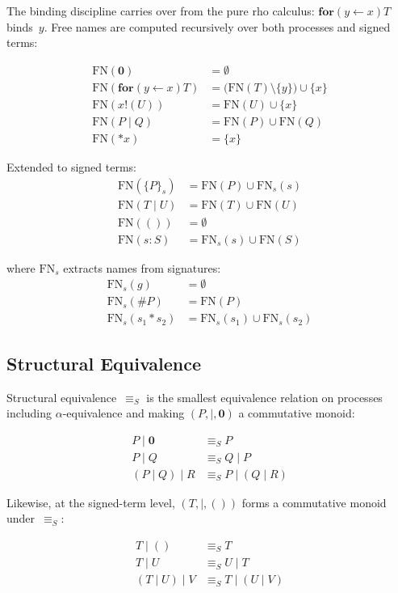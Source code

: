 \documentclass[11pt,a4paper]{article}
\newcommand{\Par}{\mathbin{|}}
\newcommand{\forc}{\mathbf{for}}
\newcommand{\send}[2]{#1 !\!\left( #2 \right)}
\newcommand{\recv}[3]{\forc\!\left( #1 \leftarrow #2 \right) #3}
\newcommand{\nil}{\mathbf{0}}
\newcommand{\drop}[1]{{\ast} #1}
\newcommand{\signed}[2]{\{#1\}_{#2}}
\newcommand{\comp}{\mathbin{*}}
\newcommand{\hashf}{\texttt{\#}}
\newcommand{\Seq}{\equiv_{\!S}}
\newcommand{\FN}{\mathrm{FN}}
\begin{document}
The binding discipline carries over from the pure rho calculus:
$\recv{y}{x}{T}$ binds~$y$.  Free names are computed
recursively over both processes and signed terms:

\begin{align*}
  \FN(\nil) &= \emptyset \\
  \FN(\recv{y}{x}{T})
    &= \bigl(\FN(T) \setminus \{y\}\bigr) \cup \{x\} \\
  \FN(\send{x}{U})
    &= \FN(U) \cup \{x\} \\
  \FN(P \Par Q) &= \FN(P) \cup \FN(Q) \\
  \FN(\drop{x}) &= \{x\}
\end{align*}

\noindent
Extended to signed terms:
\begin{align*}
  \FN(\signed{P}{s})
    &= \FN(P) \cup \FN_s(s) \\
  \FN(T \Par U)
    &= \FN(T) \cup \FN(U) \\
  \FN(())   &= \emptyset \\
  \FN(s : S)
    &= \FN_s(s) \cup \FN(S)
\end{align*}

\noindent
where $\FN_s$ extracts names from signatures:
\begin{align*}
  \FN_s(g) &= \emptyset \\
  \FN_s(\hashf P) &= \FN(P) \\
  \FN_s(s_1 \comp s_2)
    &= \FN_s(s_1) \cup \FN_s(s_2)
\end{align*}

\subsection{Structural Equivalence}
\label{sec:struct-equiv}

Structural equivalence~$\Seq$ is the smallest equivalence
relation on processes including $\alpha$-equivalence and making
$(P, \Par, \nil)$ a commutative monoid:

\begin{align*}
  P \Par \nil    &\Seq P           \\
  P \Par Q       &\Seq Q \Par P    \\
  (P \Par Q) \Par R &\Seq P \Par (Q \Par R)
\end{align*}

\noindent
Likewise, at the signed-term level, $(T, \Par, ())$ forms a
commutative monoid under~$\Seq$:

\begin{align*}
  T \Par ()      &\Seq T           \\
  T \Par U       &\Seq U \Par T    \\
  (T \Par U) \Par V &\Seq T \Par (U \Par V)
\end{align*}
\end{document}
